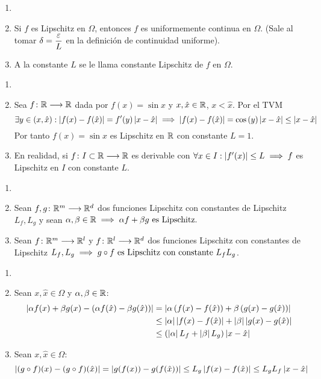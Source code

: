 \begin{obs}
\begin{enumerate}
	\item[]
	\item Si $f$ es Lipschitz en $\Omega$, entonces $f$ es uniformemente continua en $\Omega$. (Sale al tomar $\displaystyle \delta = \frac{\varepsilon}{L}$ en la definición de continuidad uniforme).
	\item A la constante $L$ se le llama constante Lipschitz de $f$ en $\Omega$.
\end{enumerate}
\end{obs}
\begin{ejem}
	\begin{enumerate}
		\item[]
		\item Sea $f \colon \mathbb{R} \longrightarrow \mathbb{R}$ dada por $f(x)=\sin{x}$ y $x, \hat{x} \in \mathbb{R}$, $x<\hat{x}$. Por el TVM
		\[\exists y \in (x, \hat{x}) : \left|f(x) - f(\hat{x})\right| = f'(y) \left|x-\hat{x}\right| \implies \left|f(x) - f(\hat{x})\right| = \cos{(y)} \left|x-\hat{x}\right| \leq \left|x-\hat{x}\right|\]
		Por tanto $f(x)=\sin{x}$ es Lipschitz en $\mathbb{R}$ con constante $L=1$.
		\item En realidad, si $f \colon I\subset\mathbb{R} \longrightarrow \mathbb{R}$ es derivable con $\forall x \in I : \left|f'(x)\right| \leq L \implies f$ es Lipschitz en $I$ con constante $L$.   
	\end{enumerate}
\end{ejem}

\begin{prop}
\begin{enumerate}
	\item[]
	\item Sean $f, g \colon \mathbb{R}^m \longrightarrow \mathbb{R}^d$ dos funciones Lipschitz con constantes de Lipschitz $L_f, L_g$ y sean $\alpha, \beta \in \mathbb{R} \implies \alpha f + \beta g \text{ es Lipschitz.}$
	\item Sean $f \colon \mathbb{R}^m \longrightarrow \mathbb{R}^l$ y $f \colon \mathbb{R}^l \longrightarrow \mathbb{R}^d$ dos funciones Lipschitz con constantes de Lipschitz $L_f, L_g \implies g\circ f \text{ es Lipschitz con constante } L_fL_g$.
\end{enumerate}
\begin{dem}
\begin{enumerate}
	\item[]
	\item Sean $x, \hat{x} \in \Omega$ y $\alpha, \beta \in \mathbb{R}$:
	\[\begin{aligned}
		\left|\alpha f(x) + \beta g(x) - \left(\alpha f(\hat{x}) - \beta g(\hat{x})\right)\right| &= \left|\alpha\left(f(x) - f(\hat{x})\right) + \beta\left(g(x) - g(\hat{x})\right)\right| \\
		&\leq \left|\alpha\right|\left|f(x) - f(\hat{x})\right| + \left|\beta\right|\left|g(x) - g(\hat{x})\right| \\
		&\leq \left(\left|\alpha\right|L_f + \left|\beta\right|L_g \right)\left|x-\hat{x}\right| 
	\end{aligned}\]
	\item Sean $x, \hat{x} \in \Omega$:
	\[\left|(g \circ f)(x) - (g \circ f)(\hat{x}) \right| = \left|g(f(x)) - g(f(\hat{x}))\right| \leq L_g\left|f(x)-f(\hat{x})\right| \leq L_gL_f\left|x-\hat{x}\right|\]
\end{enumerate}
\end{dem}
\end{prop}